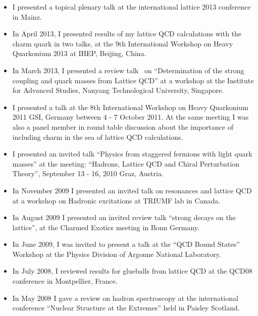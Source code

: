 \documentclass[12pt]{article}
\begin{document}
\begin{itemize}

\item I presented a topical plenary
      talk at the international lattice 2013 conference
      in Mainz.

\item In April 2013, I presented results of my lattice
      QCD calculations with the charm quark in two talks, at 
the 9th International Workshop on Heavy Quarkonium 2013 
at IHEP, Beijing, China.

\item In March 2013, I presented a 
review talk~\cite{McNeile:2013rga} on 
``Determination of the strong coupling and quark 
masses from Lattice QCD'' at a workshop
at the Institute for Advanced Studies, Nanyang Technological
University, Singapore.


\item I presented a talk at the 
8th International Workshop on Heavy Quarkonium 2011 
GSI, Germany between 4 - 7 October 2011. At the same meeting I
was also a panel member in round table discussion about the
importance of including charm in the sea of lattice QCD calculations.

\item I presented an invited talk 
   ``Physics from staggered fermions with light quark masses''
at the meeting:
``Hadrons, Lattice QCD and Chiral Perturbation Theory'',
September 13 - 16, 2010 Graz, Austria.

\item In November 2009 I presented an invited talk
      on resonances and lattice QCD at a
      workshop on Hadronic excitations at TRIUMF lab in Canada.

\item In August 2009 I presented an invited review talk
      ``strong decays on the lattice'',
       at the Charmed Exotics meeting in Bonn Germany.


\item In June 2009, I was invited to present a talk at 
      the ``QCD Bound States'' Workshop at
the Physics Division of Argonne National Laboratory.


\item In July 2008, I reviewed results 
      for glueballs from lattice QCD at the QCD08 conference
      in Montpellier, France.

\item In May 2008 I gave a review on
hadron spectroscopy at the international conference 
``Nuclear Structure at the Extremes'' held in Paisley Scotland.


\end{itemize}
\end{document}
